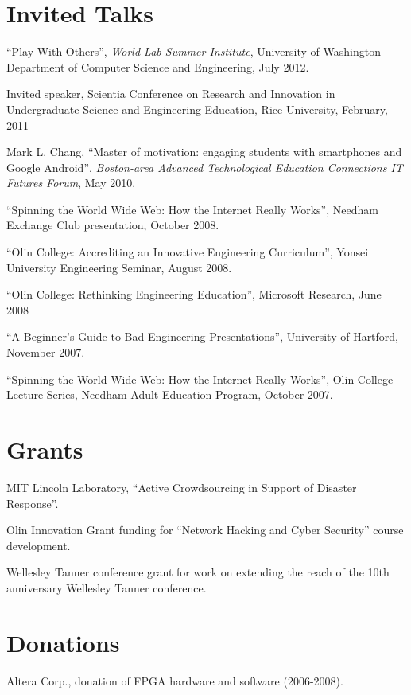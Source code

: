 \documentclass[line]{res}
\begin{document}
\begin{resume}
	\section{\sc Invited Talks}
	
	``Play With Others'', \textit{World Lab Summer Institute}, University of Washington Department of Computer Science and Engineering, July 2012.

	Invited speaker, Scientia Conference on Research and Innovation in Undergraduate Science and Engineering Education, Rice University, February, 2011
	
	Mark L. Chang, ``Master of motivation: engaging students with smartphones and Google Android'', \textit{Boston-area Advanced Technological Education Connections IT Futures Forum}, May 2010.
	
	``Spinning the World Wide Web: How the Internet Really Works'', Needham Exchange Club presentation, October 2008.
	
	``Olin College: Accrediting an Innovative Engineering Curriculum'', Yonsei University Engineering Seminar, August 2008.
	
	``Olin College: Rethinking Engineering Education'', Microsoft Research, June 2008
	
	``A Beginner's Guide to Bad Engineering Presentations'', University of Hartford, November 2007.
	
	``Spinning the World Wide Web: How the Internet Really Works'', Olin College Lecture Series, Needham Adult Education Program, October 2007.
	
	\section{\sc Grants}
	MIT Lincoln Laboratory, ``Active Crowdsourcing in Support of Disaster Response''.
	
	Olin Innovation Grant funding for ``Network Hacking and Cyber Security'' course development.
	
	Wellesley Tanner conference grant for work on extending the reach of the 10th anniversary Wellesley Tanner conference.
	
	\section{\sc Donations}
	
	Altera Corp., donation of FPGA hardware and software (2006-2008).
	

\end{resume}
\end{document}
